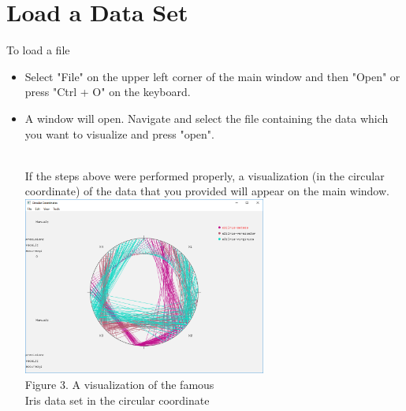 \documentclass[12pt]{article}
\begin{document}
	\section{Load a Data Set}
		To load a file
		\begin{itemize}
			\item Select "File" on the upper left corner of the main window and then "Open" or press "Ctrl + O" on the keyboard. 
			\item A window will open. Navigate and select the file containing the data which you want to visualize and press "open".
			
			\begin{figure}[H]
				\hfill
				\hfill
			\end{figure}
			\\
			
			If  the steps above were performed properly, a visualization (in the circular coordinate) of the data that you provided will appear on the main window.\\
			
			\includegraphics[width=8cm]{main_screen.png}\\
			Figure 3. A visualization of the famous\\
			Iris data set in the circular coordinate
		\end{itemize}
	
\end{document}
